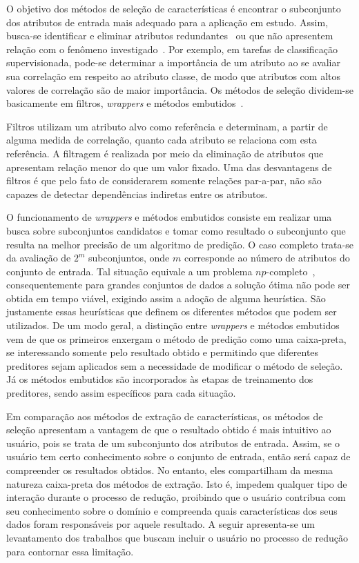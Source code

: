 O objetivo dos métodos de seleção de características é
encontrar o subconjunto  dos atributos de entrada mais
adequado para a aplicação em estudo. Assim, busca-se
identificar e eliminar atributos
redundantes~\cite{Kohavi1997} ou que não apresentem relação
com o fenômeno investigado~\cite{Nilsson2007}.  Por exemplo,
em tarefas de classificação supervisionada, pode-se
determinar a importância de um atributo ao se avaliar sua
correlação em respeito ao atributo classe, de modo que
atributos com altos valores de correlação são de maior
importância. Os métodos de seleção dividem-se basicamente
em filtros, \emph{wrappers} e métodos
embutidos~\cite{Guyon2003}. 

Filtros utilizam um atributo alvo como referência e
determinam, a partir de alguma medida de correlação, quanto
cada atributo se relaciona com esta referência. A filtragem
é realizada por meio da eliminação de atributos que apresentam relação
menor do que um valor fixado. Uma das desvantagens de
filtros é que pelo fato de considerarem somente relações
par-a-par, não são capazes de detectar dependências
indiretas entre os atributos. 

O funcionamento de \emph{wrappers} e métodos embutidos
consiste em realizar uma busca sobre subconjuntos candidatos
e tomar como resultado o subconjunto que resulta na melhor
precisão de um algoritmo de predição. O caso completo
trata-se da avaliação de $2^m$ subconjuntos, onde $m$
corresponde ao número de atributos do conjunto de entrada.
Tal situação equivale a um problema
$np$-completo~\cite{Amaldi1998}, consequentemente para
grandes conjuntos de dados a solução ótima não pode ser
obtida em tempo viável, exigindo assim a adoção de alguma
heurística. São justamente essas heurísticas que definem os
diferentes métodos que podem ser utilizados. De um modo
geral, a distinção entre \emph{wrappers} e métodos embutidos
vem de que os primeiros enxergam o método de predição como
uma caixa-preta, se interessando somente pelo resultado
obtido e permitindo que diferentes preditores sejam
aplicados sem a necessidade de modificar o método de
seleção. Já os métodos embutidos são incorporados às etapas
de treinamento dos preditores, sendo assim específicos para
cada situação. 

Em comparação aos métodos de extração de características,
os métodos de seleção apresentam a vantagem de que o
resultado obtido é mais intuitivo ao usuário, pois se trata
de um subconjunto dos atributos de entrada. Assim, se o
usuário tem certo conhecimento sobre o conjunto de entrada,
então será capaz de compreender os resultados obtidos. No
entanto, eles compartilham da mesma natureza caixa-preta dos
métodos de extração. Isto é, impedem qualquer tipo de 
interação durante o processo de redução, proibindo que o
usuário contribua com seu conhecimento sobre o domínio e
compreenda quais características dos seus dados foram
responsáveis por aquele resultado. A seguir apresenta-se um
levantamento dos trabalhos que buscam incluir o usuário no
processo de redução para contornar essa limitação.

